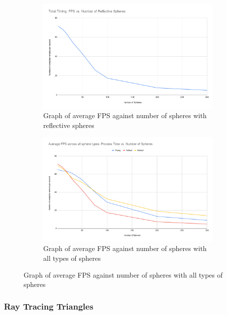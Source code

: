 \documentclass[final]{cmpreport}
\begin{document}
\begin{figure}
    \centering
    \begin{subfigure}{0.5\textwidth}
        \centering
        \includegraphics[width=\linewidth]{img/Total Timing FPS vs. Number of Reflective Spheres.png}
        \caption{Graph of average FPS against number of spheres with reflective spheres}
        \label{graphreflectspheresfps}
    \end{subfigure}%
    \begin{subfigure}{0.5\textwidth}
        \centering
        \includegraphics[width=\linewidth]{img/Average FPS across all sphere types Process Time vs. Number of Spheres.png}
        \caption{Graph of average FPS against number of spheres with all types of spheres}
        \label{graphspheresfps}
    \end{subfigure}
\end{figure}

\subsubsection{Ray Tracing Triangles}
\end{document}
